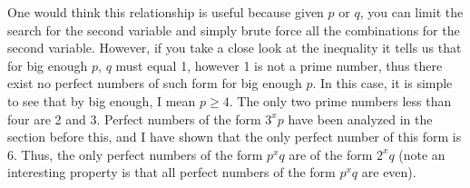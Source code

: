\documentclass{article}
\begin{document}
One would think this relationship is useful because given \(p\) or \(q\), you can limit the search for the second variable and simply brute force all the combinations for the second variable. However, if you take a close look at the inequality it tells us that for big enough \(p\), \(q\) must equal 1, however 1 is not a prime number, thus there exist no perfect numbers of such form for big enough \(p\). In this case, it is simple to see that by big enough, I mean \(p \geq 4\). The only two prime numbers less than four are 2 and 3. Perfect numbers of the form \(3^x p\) have been analyzed in the section before this, and I have shown that the only perfect number of this form is 6. Thus, the only perfect numbers of the form \(p^x q\) are of the form \(2^x q\) (note an interesting property is that all perfect numbers of the form \(p^x q\) are even).
\end{document}

